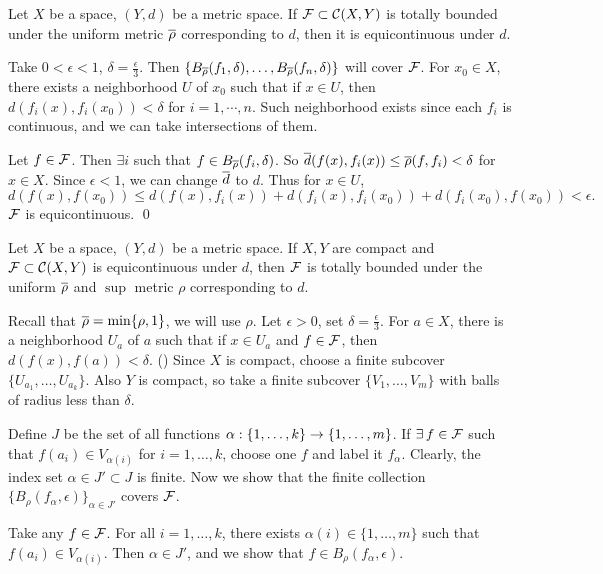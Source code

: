  Let \(X\) be a space, \((Y, d)\) be a metric space. If \(\mathcal{F} \subset \mathcal{C}(X, Y)\) is totally bounded under the uniform metric \({\overline{\rho}}\) corresponding to \(d\), then it is equicontinuous under \(d\).

\pf Take \(0 < \epsilon < 1\), \(\delta = \frac{\epsilon}{3}\). Then \(\{B_{\overline{\rho}}(f_1, \delta), \dots, B_{\overline{\rho}}(f_n, \delta)\}\) will cover \(\mathcal{F}\). For \(x_0 \in X\), there exists a neighborhood \(U\) of \(x_0\) such that if \(x \in U\), then \(d(f_i(x), f_i(x_0)) < \delta\) for \(i = 1, \cdots, n\). Such neighborhood exists since each \(f_i\) is continuous, and we can take intersections of them.

Let \(f \in \mathcal{F}\). Then \(\exists i\) such that \(f \in B_{\overline{\rho}}(f_i, \delta)\). So \({\overline{d}}(f(x), f_i(x)) \leq {\overline{\rho}}(f, f_i) < \delta\) for \(x \in X\). Since \(\epsilon < 1\), we can change \({\overline{d}}\) to \(d\). Thus for \(x \in U\),
\[
    d(f(x), f(x_0)) \leq d(f(x), f_i(x)) + d(f_i(x), f_i(x_0)) + d(f_i(x_0), f(x_0)) < \epsilon.
\]
\(\mathcal{F}\) is equicontinuous. \qed

 Let \(X\) be a space, \((Y, d)\) be a metric space. If \(X, Y\) are compact and \(\mathcal{F} \subset \mathcal{C}(X, Y)\) is equicontinuous under \(d\), then \(\mathcal{F}\) is totally bounded under the uniform \({\overline{\rho}}\) and \(\sup\) metric \(\rho\) corresponding to \(d\).

\pf Recall that \({\overline{\rho}} = \min\{\rho, 1\}\), we will use \(\rho\). Let \(\epsilon > 0\), set \(\delta = \frac{\epsilon}{3}\). For \(a \in X\), there is a neighborhood \(U_a\) of \(a\) such that if \(x \in U_a\) and \(f \in \mathcal{F}\), then \(d(f(x), f(a)) < \delta\). (\mast) Since \(X\) is compact, choose a finite subcover \(\{U_{a_1}, \dots, U_{a_k}\}\). Also \(Y\) is compact, so take a finite subcover \(\{V_1, \dots, V_m\}\) with balls of radius less than \(\delta\).

Define \(J\) be the set of all functions \(\alpha : \{1, \dots, k\} \rightarrow \{1, \dots, m\}\). If \(\exists f \in \mc{F}\) such that \(f(a_i) \in V_{\alpha(i)}\) for \(i = 1, \dots, k\), choose one \(f\) and label it \(f_\alpha\). Clearly, the index set \(\alpha \in J' \subset J\) is finite. Now we show that the finite collection \(\{B_\rho(f_\alpha, \epsilon)\}_{\alpha \in J'}\) covers \(\mathcal{F}\).

Take any \(f \in \mathcal{F}\). For all \(i = 1, \dots, k\), there exists \(\alpha(i) \in \{1, \dots, m\}\) such that \(f(a_i) \in V_{\alpha(i)}\). Then \(\alpha \in J'\), and we show that \(f \in B_\rho(f_\alpha, \epsilon)\).

